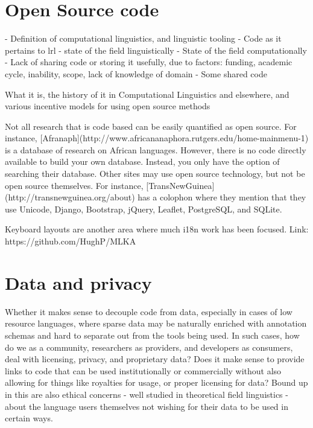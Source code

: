 \documentclass[10pt, a4paper]{article}
\begin{document}
\section{Open Source code}


- Definition of computational linguistics, and linguistic tooling
- Code as it pertains to lrl
- state of the field linguistically
- State of the field computationally
- Lack of sharing code or storing it usefully, due to factors: funding, academic cycle, inability, scope, lack of knowledge of domain
- Some shared code


What it is, the history of it in Computational Linguistics and elsewhere, and various incentive models for using open source methods

Not all research that is code based can be easily quantified as open source. For instance, [Afranaph](http://www.africananaphora.rutgers.edu/home-mainmenu-1) is a database of research on African languages. However, there is no code directly available to build your own database. Instead, you only have the option of searching their database. Other sites may use open source technology, but not be open source themselves. For instance, [TransNewGuinea](http://transnewguinea.org/about) has a colophon where they mention that they use Unicode, Django, Bootstrap, jQuery, Leaflet, PostgreSQL, and SQLite.

Keyboard layouts are another area where much i18n work has been focused. Link: https://github.com/HughP/MLKA

\section{Data and privacy}

Whether it makes sense to decouple code from data, especially in cases of low resource languages, where sparse data may be naturally enriched with annotation schemas and hard to separate out from the tools being used. In such cases, how do we as a community, researchers as providers, and developers as consumers, deal with licensing, privacy, and proprietary data? Does it make sense to provide links to code that can be used institutionally or commercially without also allowing for things like royalties for usage, or proper licensing for data? Bound up in this are also ethical concerns - well studied in theoretical field linguistics - about the language users themselves not wishing for their data to be used in certain ways.

\end{document}
